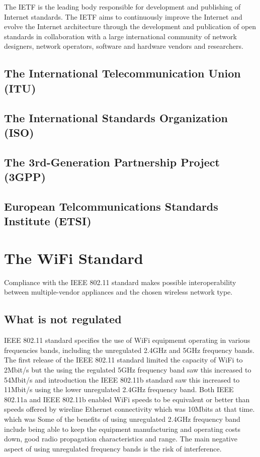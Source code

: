 The IETF is the leading body responsible for development and publishing of Internet standards. The IETF aims to continuously improve the Internet and evolve the Internet architecture through the development and publication of open standards in collaboration with a large international community of network designers, network operators, software and hardware vendors and researchers. 

\subsection{The International Telecommunication Union (ITU)}\label{ITU}



\subsection{The International Standards Organization (ISO)}

\subsection{The 3rd-Generation Partnership Project (3GPP)}

\subsection{European Telcommunications Standards Institute (ETSI)}\label{ETSI}

\section{The WiFi Standard}

Compliance with the IEEE 802.11 standard makes possible interoperability between multiple-vendor appliances and the chosen wireless network type.

\subsection{What is not regulated}

IEEE 802.11 standard specifies the use of WiFi equipmemt operating in various frequencies bands, including the unregulated 2.4GHz and 5GHz frequency bands.  The first release of the IEEE 802.11 standard limited the capacity of WiFi to 2Mbit/s but the  using the regulated 5GHz frequency band saw this increased to 54Mbit/s and introduction the IEEE 802.11b standard saw this increased to 11Mbit/s using the lower unregulated 2.4GHz frequency band. Both IEEE 802.11a and IEEE 802.11b enabled WiFi speeds to be equivalent or better than speeds offered by wireline Ethernet connectivity which was  10Mbits at that time. which was Some of the benefits of using unregulated 2.4GHz frequency band include being able to keep the equipment manufacturing and operating costs down, good radio propagation characteristics and range.  The main negative aspect of using unregulated frequency bands is the risk of interference. 

